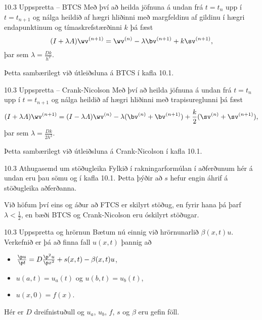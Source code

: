   \begin{frame}{10.3 Uppspretta -- BTCS}
   Með því að heilda jöfnuna á undan frá $t=t_n$ upp í $t=t_{n+1}$
   og nálga heildið af hægri hliðinni með margfeldinu af gildinu í hægri
   endapunktinum og tímaskrefstærðinni $k$ þá fæst
   $$
    (I+\lambda A)\wv^{(n+1)} = \wv^{(n)} - \lambda \bv^{(n+1)} + k\sv^{(n+1)},
    $$
    þar sem $\lambda = \frac{Dk}{h^2}$. \pause
    
    \smallskip
    Þetta sambærilegt við útleiðsluna á BTCS í kafla 10.1.
  \end{frame}
  
  \begin{frame}{10.3 Uppspretta -- Crank-Nicolson}
   Með því að heilda jöfnuna á undan frá $t=t_n$ upp í $t=t_{n+1}$
   og nálga heildið af hægri hliðinni með trapisureglunni þá fæst
   $$
     (I+\lambda A)\wv^{(n+1)} = (I-\lambda A)\wv^{(n)} 
     - \lambda (\bv^{(n)}+\bv^{(n+1)}) + \frac k2(\sv^{(n)}+\sv^{(n+1)}),
    $$
    þar sem $\lambda = \frac{Dk}{2h^2}$. \pause
    
    \smallskip
    Þetta sambærilegt við útleiðsluna á Crank-Nicolson í kafla 10.1.
  \end{frame}
  
  \begin{frame}{10.3 Athugasemd um stöðugleika}
   Fylkið í rakningarformúlan í aðferðunum hér á undan eru þau sömu og í
   kafla 10.1. Þetta þýðir að $s$ hefur engin áhrif á stöðugleika aðferðanna.
   \pause
   \medskip
   
   Við höfum því eins og áður að FTCS er skilyrt stöðug, en fyrir hana þá þarf 
   $\lambda < \frac 12$, en bæði BTCS og Crank-Nicolson eru 
   óskilyrt stöðugar.
  \end{frame}

  \begin{frame}{10.3 Uppspretta og hrörnun}
   Bætum nú einnig við hrörnunarlið $\beta(x,t)u$. \pause
   Verkefnið er þá að finna fall $u(x,t)$ þannig að 
   \begin{itemize}
 \item $\frac{\p u}{\p t} =  D \frac{\p^2 u}{\p x^2} + s(x,t) - \beta(x,t)u$,
 \item $u(a,t) = u_a(t)$ og $u(b,t) = u_b(t)$, 
 \item $u(x,0) = f(x)$.
\end{itemize}
Hér er $D$ dreifnistuðull og $u_a$, $u_b$, $f$, $s$ og $\beta$ eru gefin
föll.

\end{frame}

